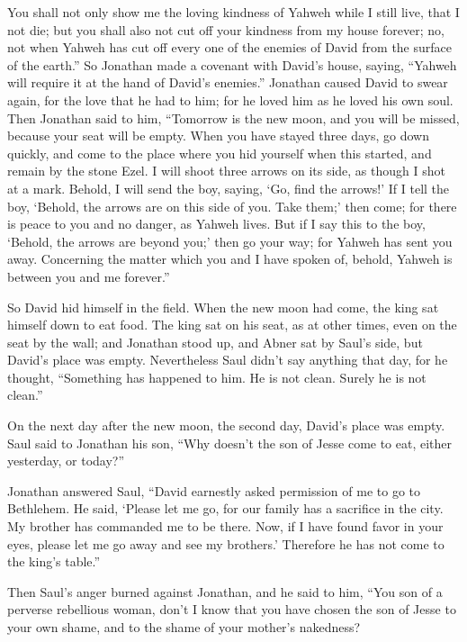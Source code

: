 {You shall not only show me the loving kindness of Yahweh while I still live, that I not die;
but you shall also not cut off your kindness from my house forever; no, not when Yahweh has cut off every one of the enemies of David from the surface of the earth.”
So Jonathan made a covenant with David’s house, saying, “Yahweh will require it at the hand of David’s enemies.”
Jonathan caused David to swear again, for the love that he had to him; for he loved him as he loved his own soul.
Then Jonathan said to him, “Tomorrow is the new moon, and you will be missed, because your seat will be empty.
When you have stayed three days, go down quickly, and come to the place where you hid yourself when this started, and remain by the stone Ezel.
I will shoot three arrows on its side, as though I shot at a mark.
Behold, I will send the boy, saying, ‘Go, find the arrows!’ If I tell the boy, ‘Behold, the arrows are on this side of you. Take them;’ then come; for there is peace to you and no danger, as Yahweh lives.
But if I say this to the boy, ‘Behold, the arrows are beyond you;’ then go your way; for Yahweh has sent you away.
Concerning the matter which you and I have spoken of, behold, Yahweh is between you and me forever.”
\par }{\PP {}So David hid himself in the field. When the new moon had come, the king sat himself down to eat food.
The king sat on his seat, as at other times, even on the seat by the wall; and Jonathan stood up, and Abner sat by Saul’s side, but David’s place was empty.
Nevertheless Saul didn’t say anything that day, for he thought, “Something has happened to him. He is not clean. Surely he is not clean.”
\par }{\PP {}On the next day after the new moon, the second day, David’s place was empty. Saul said to Jonathan his son, “Why doesn’t the son of Jesse come to eat, either yesterday, or today?”
\par }{\PP {}Jonathan answered Saul, “David earnestly asked permission of me to go to Bethlehem.
He said, ‘Please let me go, for our family has a sacrifice in the city. My brother has commanded me to be there. Now, if I have found favor in your eyes, please let me go away and see my brothers.’ Therefore he has not come to the king’s table.”
\par }{\PP {}Then Saul’s anger burned against Jonathan, and he said to him, “You son of a perverse rebellious woman, don’t I know that you have chosen the son of Jesse to your own shame, and to the shame of your mother’s nakedness?
}

